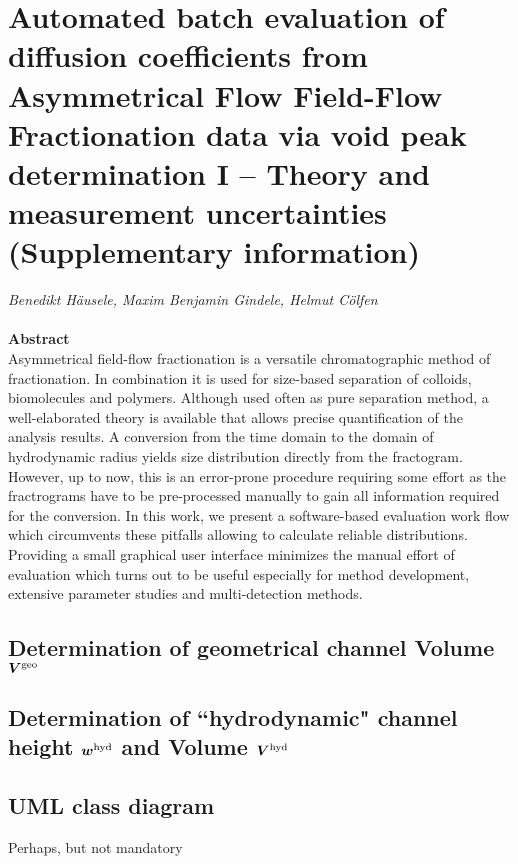 \chapter*{Automated batch evaluation of diffusion coefficients from Asymmetrical Flow 
  Field-Flow Fractionation data via void peak determination I -- Theory and measurement 
uncertainties (Supplementary information)}
  
\emph{Benedikt Häusele, Maxim Benjamin Gindele, Helmut Cölfen}\\
\noindent\hrulefill\\
\textbf{Abstract}\\
Asymmetrical field-flow fractionation is a versatile chromatographic method of fractionation. In combination it is used 
for size-based separation of colloids, biomolecules and polymers. Although used often as pure separation method, a 
well-elaborated theory is available that allows precise quantification of the analysis results. A conversion from the 
time domain to the domain of hydrodynamic radius yields size distribution directly from the fractogram. However, up to 
now, this is an error-prone procedure requiring some effort as the fractrograms have to be pre-processed manually to 
gain all information required for the conversion. In this work, we present a software-based evaluation work flow which 
circumvents these pitfalls allowing to calculate reliable distributions. Providing a small graphical user interface 
minimizes the manual effort of evaluation which turns out to be useful especially for method development, extensive 
parameter studies and multi-detection methods.

\noindent\hrulefill
\section*{Determination of geometrical channel Volume $\bm{V^\text{geo}}$}


\clearpage
\section*{Determination of ``hydrodynamic" channel height $\bm{w^\text{hyd}}$ and Volume $\bm{V^\text{hyd}}$}


\section*{UML class diagram}
Perhaps, but not mandatory

